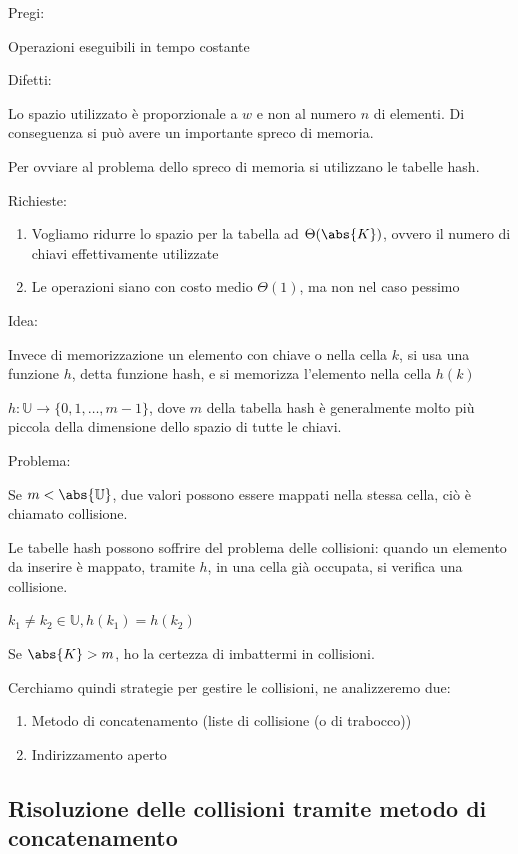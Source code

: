 \documentclass{article}
\providecommand{\tightlist}{%
  \setlength{\itemsep}{0pt}\setlength{\parskip}{0pt}}
\begin{document}
{Pregi:}

{Operazioni eseguibili in tempo costante}

{Difetti:}

{Lo spazio utilizzato è proporzionale a $w$ e non al numero $n$ di elementi. Di conseguenza si può avere un importante spreco di memoria.}

{Per ovviare al problema dello spreco di memoria si utilizzano le tabelle hash.}

{Richieste:}

\begin{enumerate}
\tightlist
\item
  {Vogliamo ridurre lo spazio per la tabella ad $\Theta(\abs{K})$, ovvero il numero di chiavi
  effettivamente utilizzate}
\item
  {Le operazioni siano con costo medio $\Theta(1)$, ma non nel caso pessimo}
\end{enumerate}

{Idea:}

{Invece di memorizzazione un elemento con chiave o nella cella $k$, si usa una funzione $h$, detta funzione hash, e si memorizza l'elemento nella cella $h(k)$}


{$h:\mathbb{U}\rightarrow\{0,1,\ldots,m-1\}$, dove $m$ della tabella hash è generalmente molto più piccola della dimensione dello spazio di tutte le chiavi.}

{Problema: }

{Se $m < \abs{\mathbb{U}}$, due valori possono essere mappati nella stessa cella, ciò è chiamato collisione. }

{Le tabelle hash possono soffrire del problema delle collisioni: quando un elemento da inserire è mappato, tramite $h$, in una cella già occupata, si verifica una collisione.}

$k_1 \neq k_2 \in \mathbb{U}, h(k_1) = h(k_2)$

{Se $\abs{K} > m$, ho la certezza di imbattermi in collisioni.}

{Cerchiamo quindi strategie per gestire le collisioni, ne analizzeremo due:}

\begin{enumerate}
\tightlist
\item
  {Metodo di concatenamento (liste di collisione (o di trabocco))}
\item
  {Indirizzamento aperto}
\end{enumerate}

\subsection{Risoluzione delle collisioni tramite metodo di concatenamento}
\end{document}
